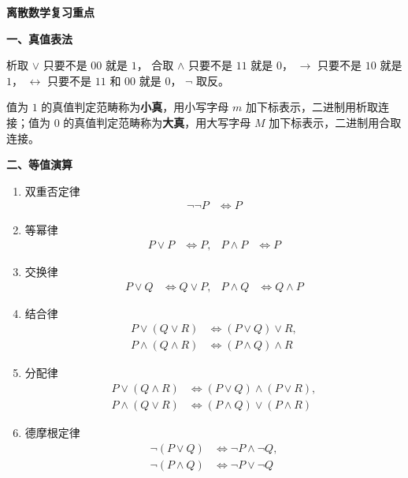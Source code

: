 \pagestyle{plain}
\songti
\begin{center}
    \Large
    \textbf{离散数学复习重点}
\end{center}


\noindent\textbf{一、真值表法}

析取 \(\lor\) 只要不是 \(00\) 就是 \(1\)，
合取 \(\land\) 只要不是 \(11\) 就是 \(0\)，
\(\to\) 只要不是 \(10\) 就是 \(1\)，
\(\leftrightarrow\) 只要不是 \(11\) 和 \(00\) 就是 \(0\)，
\(\neg\) 取反。

值为 $1$ 的真值判定范畴称为\textbf{小真}，用小写字母 $m$ 加下标表示，二进制用析取连接；值为 $0$ 的真值判定范畴称为\textbf{大真}，用大写字母 $M$ 加下标表示，二进制用合取连接。

\noindent\textbf{二、等值演算}

\begin{enumerate}
    \item 双重否定律
    \begin{align*}
        \neg \neg P &\Leftrightarrow P
    \end{align*}

    \item 等幂律
    \begin{align*}
        P \vee P &\Leftrightarrow P, &
        P \wedge P &\Leftrightarrow P
    \end{align*}

    \item 交换律
    \begin{align*}
        P \vee Q &\Leftrightarrow Q \vee P, &
        P \wedge Q &\Leftrightarrow Q \wedge P
    \end{align*}

    \item 结合律
    \begin{align*}
        P \vee (Q \vee R) &\Leftrightarrow (P \vee Q) \vee R, \\
        P \wedge (Q \wedge R) &\Leftrightarrow (P \wedge Q) \wedge R
    \end{align*}

    \item 分配律
    \begin{align*}
        P \vee (Q \wedge R) &\Leftrightarrow (P \vee Q) \wedge (P \vee R), \\
        P \wedge (Q \vee R) &\Leftrightarrow (P \wedge Q) \vee (P \wedge R)
    \end{align*}

    \item 德摩根定律
    \begin{align*}
        \neg (P \vee Q) &\Leftrightarrow \neg P \wedge \neg Q, \\
        \neg (P \wedge Q) &\Leftrightarrow \neg P \vee \neg Q
    \end{align*}


\end{enumerate}

